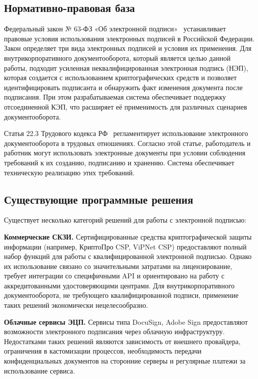 \documentclass[a4paper,12pt]{extarticle}
\begin{document}
\subsection{Нормативно-правовая база}

Федеральный закон № 63-ФЗ «Об электронной подписи»~\cite{fz63} устанавливает правовые условия использования электронных подписей в Российской Федерации. Закон определяет три вида электронных подписей и условия их применения. Для внутрикорпоративного документооборота, который является целью данной работы, подходит усиленная неквалифицированная электронная подпись (НЭП), которая создается с использованием криптографических средств и позволяет идентифицировать подписанта и обнаружить факт изменения документа после подписания. При этом разрабатываемая система обеспечивает поддержку отсоединенной КЭП, что расширяет её применимость для различных сценариев документооборота.

Статья 22.3 Трудового кодекса РФ~\cite{tk_rf} регламентирует использование электронного документооборота в трудовых отношениях. Согласно этой статье, работодатель и работник могут использовать электронные документы при условии соблюдения требований к их созданию, подписанию и хранению. Система обеспечивает техническую реализацию этих требований.

\subsection{Существующие программные решения}

Существует несколько категорий решений для работы с электронной подписью:

\textbf{Коммерческие СКЗИ.} Сертифицированные средства криптографической защиты информации (например, КриптоПро CSP, ViPNet CSP) предоставляют полный набор функций для работы с квалифицированной электронной подписью. Однако их использование связано со значительными затратами на лицензирование, требует интеграции со специфичными API и ориентировано на работу с аккредитованными удостоверяющими центрами. Для внутрикорпоративного документооборота, не требующего квалифицированной подписи, применение таких решений экономически нецелесообразно.

\textbf{Облачные сервисы ЭЦП.} Сервисы типа DocuSign, Adobe Sign предоставляют возможности электронного подписания через облачную инфраструктуру. Недостатками таких решений являются зависимость от внешнего провайдера, ограничения в кастомизации процессов, необходимость передачи конфиденциальных документов на сторонние серверы и регулярные платежи за использование сервиса.
\end{document}

